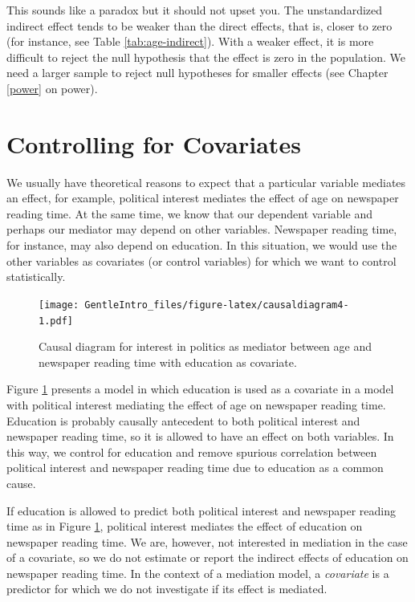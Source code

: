 \documentclass[a4paper]{book}
\theoremstyle{definition}
\theoremstyle{definition}
\theoremstyle{definition}
\theoremstyle{remark}
\begin{document}
This sounds like a paradox but it should not upset you. The
unstandardized indirect effect tends to be weaker than the direct
effects, that is, closer to zero (for instance, see Table
\ref{tab:age-indirect}). With a weaker effect, it is more difficult to
reject the null hypothesis that the effect is zero in the population. We
need a larger sample to reject null hypotheses for smaller effects (see
Chapter \ref{power} on power).

\section{Controlling for Covariates}\label{controlling-for-covariates}

We usually have theoretical reasons to expect that a particular variable
mediates an effect, for example, political interest mediates the effect
of age on newspaper reading time. At the same time, we know that our
dependent variable and perhaps our mediator may depend on other
variables. Newspaper reading time, for instance, may also depend on
education. In this situation, we would use the other variables as
covariates (or control variables) for which we want to control
statistically.

\begin{figure}
\centering
\texttt{[image: GentleIntro\_files/figure-latex/causaldiagram4-1.pdf]}
\caption{\label{fig:causaldiagram4}Causal diagram for interest in politics
as mediator between age and newspaper reading time with education as
covariate.}
\end{figure}

Figure \ref{fig:causaldiagram4} presents a model in which education is
used as a covariate in a model with political interest mediating the
effect of age on newspaper reading time. Education is probably causally
antecedent to both political interest and newspaper reading time, so it
is allowed to have an effect on both variables. In this way, we control
for education and remove spurious correlation between political interest
and newspaper reading time due to education as a common cause.

If education is allowed to predict both political interest and newspaper
reading time as in Figure \ref{fig:causaldiagram4}, political interest
mediates the effect of education on newspaper reading time. We are,
however, not interested in mediation in the case of a covariate, so we
do not estimate or report the indirect effects of education on newspaper
reading time. In the context of a mediation model, a \emph{covariate} is
a predictor for which we do not investigate if its effect is mediated.
\end{document}
